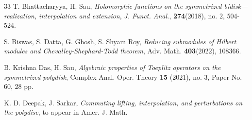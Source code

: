 \documentclass[12pt,reqno]{amsart}
\theoremstyle{remark}
\theoremstyle{definition}
\begin{document}
\begin{thebibliography}{33}
 T. Bhattacharyya, H. Sau, \emph{Holomorphic functions on the symmetrized bidisk—realization, interpolation and extension}, \textit{J. Funct. Anal.}, {\bf 274}(2018), no. 2, 504-524.


 S. Biswas, S. Datta, G. Ghosh, S. Shyam Roy, \emph{Reducing submodules of Hilbert modules and Chevalley-Shephard-Todd theorem}, Adv. Math. {\bf 403}(2022), 108366.















 B. Krishna Das, H. Sau, \emph{Algebraic properties of Toeplitz operators on the symmetrized polydisk}, Complex Anal. Oper. Theory {\bf 15} (2021), no. 3, Paper No. 60, 28 pp.

 K. D. Deepak, J. Sarkar, \emph{Commuting lifting, interpolation, and perturbations on the polydisc}, to appear in Amer. J. Math.



\end{thebibliography}
\end{document}

